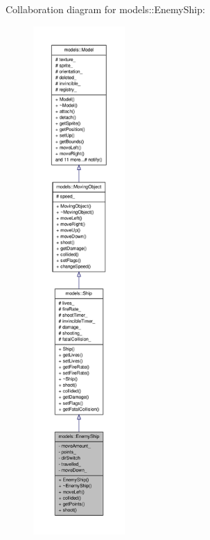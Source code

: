 \-Collaboration diagram for models\-:\-:\-Enemy\-Ship\-:\nopagebreak
\begin{figure}[H]
\begin{center}
\leavevmode
\includegraphics[height=550pt]{db/dbd/classmodels_1_1EnemyShip__coll__graph}
\end{center}
\end{figure}
